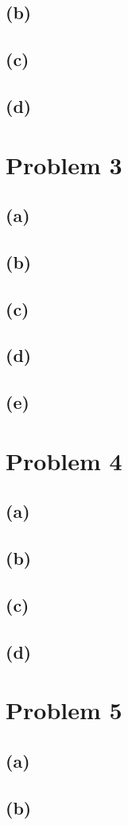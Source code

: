 \documentclass{article}
\begin{document}
\subsection{(b)}
\subsection{(c)}
\subsection{(d)}

\section{Problem 3}
\subsection{(a)}
\subsection{(b)}
\subsection{(c)}
\subsection{(d)}
\subsection{(e)}

\section{Problem 4}
\subsection{(a)}
\subsection{(b)}
\subsection{(c)}
\subsection{(d)}

\section{Problem 5}
\subsection{(a)}
\subsection{(b)}
\end{document}
